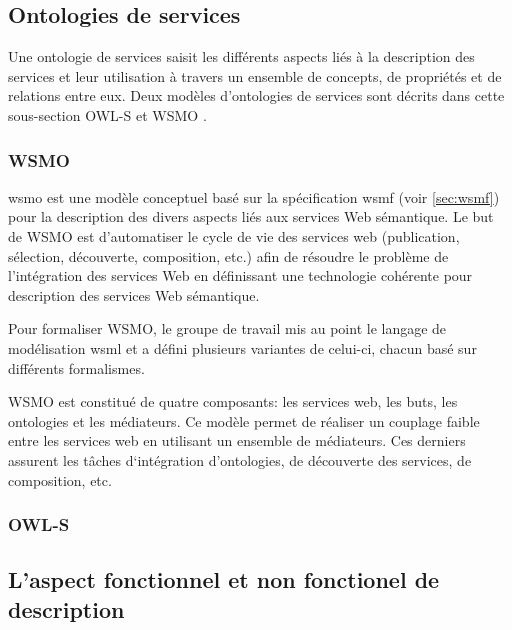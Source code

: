   \subsection{Ontologies de services}
  \label{sec:ont-serices}

  Une ontologie de services saisit les différents aspects liés à la
  description des services et leur utilisation à travers un ensemble
  de concepts, de propriétés et de relations entre eux. Deux modèles
  d'ontologies de services sont décrits dans cette sous-section
  \textsc{OWL-S} et \textsc{WSMO} \cite{elie2010}.

    \subsubsection{WSMO}
    \label{sec:wsmo}

    \acrshort{wsmo} \cite{de2005web} est une modèle conceptuel basé
    sur la spécification \acrshort{wsmf} \cite{fensel2002web} (voir
    \ref{sec:wsmf}) pour la description des divers aspects liés aux
    services Web sémantique. Le but de \textsc{WSMO} est d'automatiser
    le cycle de vie des services web (publication, sélection,
    découverte, composition, etc.) afin de résoudre le problème de
    l'intégration des services Web en définissant une technologie
    cohérente pour description des services Web sémantique.

    Pour formaliser \textsc{WSMO}, le groupe de travail mis au point
    le langage de modélisation \acrshort{wsml} \cite{de2006web} et a
    défini plusieurs variantes de celui-ci, chacun basé sur différents
    formalismes.

    \textsc{WSMO} est constitué de quatre composants: les services
    web, les buts, les ontologies et les médiateurs. Ce modèle permet
    de réaliser un couplage faible entre les services web en utilisant
    un ensemble de médiateurs. Ces derniers assurent les tâches
    d‘intégration d'ontologies, de découverte des services, de
    composition, etc.

    \subsubsection{OWL-S}
    \label{sec:owl-s-1}

  \subsection{L'aspect fonctionnel et non fonctionel de description}
  \label{sec:func-vs-non-func}
  {\color{red}
    \cite{el2014cbr4wsd}
  }

